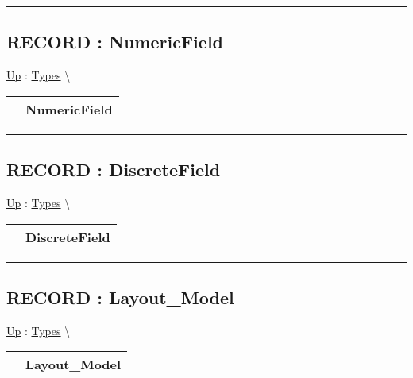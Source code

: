 \par


\rule{\linewidth}{0.5pt}
\subsection*{RECORD : NumericField}
\hypertarget{ecldoc:ml_core.types.numericfield}{}
\hyperlink{ecldoc:ML_Core.Types}{Up} :
\hspace{0pt} \hyperlink{ecldoc:ML_Core.Types}{Types} \textbackslash 

{\renewcommand{\arraystretch}{1.5}
\begin{tabularx}{\textwidth}{|>{\raggedright\arraybackslash}l|X|}
\hline
\hspace{0pt} & NumericField \\
\hline
\end{tabularx}
}

\par


\rule{\linewidth}{0.5pt}
\subsection*{RECORD : DiscreteField}
\hypertarget{ecldoc:ml_core.types.discretefield}{}
\hyperlink{ecldoc:ML_Core.Types}{Up} :
\hspace{0pt} \hyperlink{ecldoc:ML_Core.Types}{Types} \textbackslash 

{\renewcommand{\arraystretch}{1.5}
\begin{tabularx}{\textwidth}{|>{\raggedright\arraybackslash}l|X|}
\hline
\hspace{0pt} & DiscreteField \\
\hline
\end{tabularx}
}

\par


\rule{\linewidth}{0.5pt}
\subsection*{RECORD : Layout\_Model}
\hypertarget{ecldoc:ml_core.types.layout_model}{}
\hyperlink{ecldoc:ML_Core.Types}{Up} :
\hspace{0pt} \hyperlink{ecldoc:ML_Core.Types}{Types} \textbackslash 

{\renewcommand{\arraystretch}{1.5}
\begin{tabularx}{\textwidth}{|>{\raggedright\arraybackslash}l|X|}
\hline
\hspace{0pt} & Layout\_Model \\
\hline
\end{tabularx}
}

